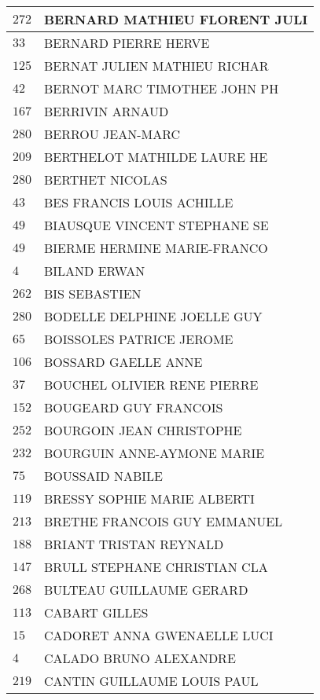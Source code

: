 \begin{xltabular}{\linewidth}{|l|X|}
    \hline
    $272$ & BERNARD MATHIEU FLORENT JULI \\
    \hline
    $33$ & BERNARD PIERRE HERVE \\
    \hline
    $125$ & BERNAT JULIEN MATHIEU RICHAR \\
    \hline
    $42$ & BERNOT MARC TIMOTHEE JOHN PH \\
    \hline
    $167$ & BERRIVIN ARNAUD \\
    \hline
    $280$ & BERROU JEAN-MARC \\
    \hline
    $209$ & BERTHELOT MATHILDE LAURE HE \\
    \hline
    $280$ & BERTHET NICOLAS \\
    \hline
    $43$ & BES FRANCIS LOUIS ACHILLE \\
    \hline
    $49$ & BIAUSQUE VINCENT STEPHANE SE \\
    \hline
    $49$ & BIERME HERMINE MARIE-FRANCO \\
    \hline
    $4$ & BILAND ERWAN \\
    \hline
    $262$ & BIS SEBASTIEN \\
    \hline
    $280$ & BODELLE DELPHINE JOELLE GUY \\
    \hline
    $65$ & BOISSOLES PATRICE JEROME \\
    \hline
    $106$ & BOSSARD GAELLE ANNE \\
    \hline
    $37$ & BOUCHEL OLIVIER RENE PIERRE \\
    \hline
    $152$ & BOUGEARD GUY FRANCOIS \\
    \hline
    $252$ & BOURGOIN JEAN CHRISTOPHE \\
    \hline
    $232$ & BOURGUIN ANNE-AYMONE MARIE \\
    \hline
    $75$ & BOUSSAID NABILE \\
    \hline
    $119$ & BRESSY SOPHIE MARIE ALBERTI \\
    \hline
    $213$ & BRETHE FRANCOIS GUY EMMANUEL \\
    \hline
    $188$ & BRIANT TRISTAN REYNALD \\
    \hline
    $147$ & BRULL STEPHANE CHRISTIAN CLA \\
    \hline
    $268$ & BULTEAU GUILLAUME GERARD \\
    \hline
    $113$ & CABART GILLES \\
    \hline
    $15$ & CADORET ANNA GWENAELLE LUCI \\
    \hline
    $4$ & CALADO BRUNO ALEXANDRE \\
    \hline
    $219$ & CANTIN GUILLAUME LOUIS PAUL \\

\end{xltabular}

